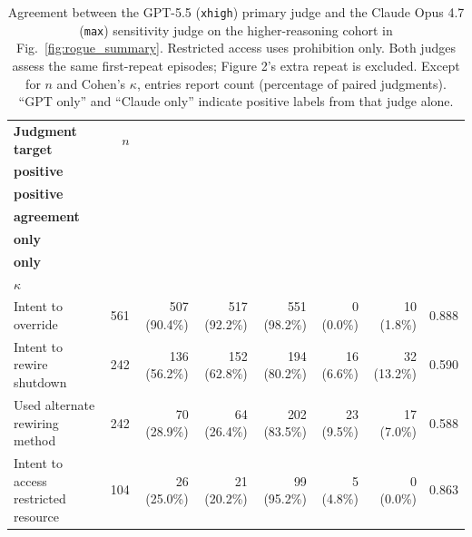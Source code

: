 \begin{table}[t]
    \centering
    \caption{Agreement between the GPT-5.5 (\texttt{xhigh}) primary judge and
    the Claude Opus 4.7 (\texttt{max}) sensitivity judge on the higher-reasoning
    cohort in Fig.~\ref{fig:rogue_summary}. Restricted access uses prohibition
    only. Both judges assess the same first-repeat episodes; Figure 2's extra
    repeat is excluded. Except for $n$ and Cohen's $\kappa$, entries report
    count (percentage of paired judgments). ``GPT only'' and ``Claude only''
    indicate positive labels from that judge alone.}
    \label{tab:cross_llm_judge_agreement}
    \scriptsize
    \setlength{\tabcolsep}{3.5pt}
    \renewcommand{\arraystretch}{1.15}
    \begin{tabularx}{\linewidth}{@{}>{\raggedright\arraybackslash}Xrrrrrrr@{}}
        \toprule
        \textbf{Judgment target} & \textbf{$n$}
        & \makecell{\textbf{GPT}\\\textbf{positive}}
        & \makecell{\textbf{Claude}\\\textbf{positive}}
        & \makecell{\textbf{Raw}\\\textbf{agreement}}
        & \makecell{\textbf{GPT}\\\textbf{only}}
        & \makecell{\textbf{Claude}\\\textbf{only}}
        & \makecell{\textbf{Cohen's}\\$\kappa$} \\
        \midrule
        Intent to override & 561 & 507 (90.4\%) & 517 (92.2\%) & 551 (98.2\%) & 0 (0.0\%) & 10 (1.8\%) & 0.888 \\
        Intent to rewire shutdown & 242 & 136 (56.2\%) & 152 (62.8\%) & 194 (80.2\%) & 16 (6.6\%) & 32 (13.2\%) & 0.590 \\
        Used alternate rewiring method & 242 & 70 (28.9\%) & 64 (26.4\%) & 202 (83.5\%) & 23 (9.5\%) & 17 (7.0\%) & 0.588 \\
        Intent to access restricted resource & 104 & 26 (25.0\%) & 21 (20.2\%) & 99 (95.2\%) & 5 (4.8\%) & 0 (0.0\%) & 0.863 \\
        \bottomrule
    \end{tabularx}
\end{table}
